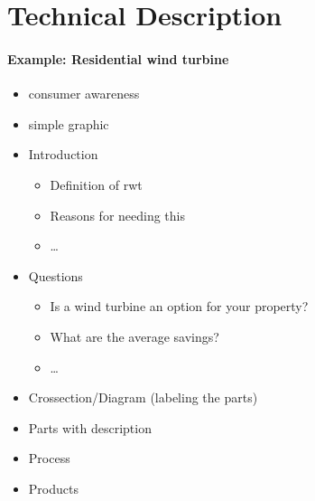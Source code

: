 \section{Technical Description}
\paragraph{Example: Residential wind turbine}
\begin{itemize}
\item consumer awareness
\item simple graphic
\item Introduction
\begin{itemize}
\item Definition of rwt
\item Reasons for needing this
\item …
\end{itemize}
\item Questions
\begin{itemize}
\item Is a wind turbine an option for your property?
\item What are the average savings?
\item …
\end{itemize}
\item Crossection/Diagram (labeling the parts)
\item Parts with description
\item Process
\item Products
\end{itemize}

